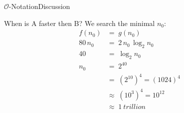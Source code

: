 
\begin{frame}{$\mathcal{O}$-Notation}{Discussion}
  \begin{block}{When is A faster then B?}%
    We search the minimal $n_0$:
    \begin{align*}%
      f(n_0) & = \; g(n_0)\\
      80 \, n_0 & = \; 2 \, n_0 \, \log_2 n_0\\
      40 & = \; \log_2 n_0\\
      n_0 & = \; 2^{40}\\
      {} & = \; (2^{10})^4 = (1024)^4\\
      {} & \approx \; (10^3)^4 = 10^{12}\\
      {} & \approx \; \SI{1}{trillion}
    \end{align*}
  \end{block}
\end{frame}